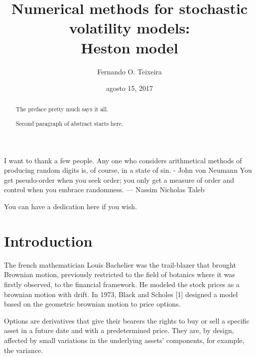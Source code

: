 \documentclass[12pt,twoside]{reedthesis}
\title{\textbf{\Huge{Numerical methods for stochastic volatility models: \\[20pt] Heston model}}}
\author{Fernando O. Teixeira}
\date{agosto 15, 2017}
\theoremstyle{definition}
\theoremstyle{definition}
\theoremstyle{remark}
\begin{document}
      \maketitle
  
  \frontmatter %
  \pagestyle{empty} %
      \begin{acknowledgements}
      I want to thank a few people. Any one who considers arithmetical methods
      of producing random digits is, of course, in a state of sin. - John von
      Neumann You get pseudo-order when you seek order; you only get a measure
      of order and control when you embrace randomness. --- Nassim Nicholas
      Taleb
    \end{acknowledgements}
  
      \hypersetup{linkcolor=black}
    \setcounter{tocdepth}{2}
    \tableofcontents
  
      \listoftables
  
      \listoffigures
      \begin{abstract}
      The preface pretty much says it all. \par  Second paragraph of abstract
      starts here.
    \end{abstract}
      \begin{dedication}
      You can have a dedication here if you wish.
    \end{dedication}
  \mainmatter %
  \pagestyle{fancyplain} %

  \chapter{Introduction}\label{intro}
  
  The french mathematician Louis Bachelier was the trail-blazer that
  brought Brownian motion, previously restricted to the field of botanics
  where it was firstly observed, to the financial framework. He modeled
  the stock prices as a brownian motion with drift. In 1973, Black and
  Scholes {[}1{]} designed a model based on the geometric brownian motion
  to price options.
  
  Options are derivatives that give their bearers the rights to buy or
  sell a specific asset in a future date and with a predetermined price.
  They are, by design, affected by small variations in the underlying
  assets' components, for example, the variance.
  
\end{document}

